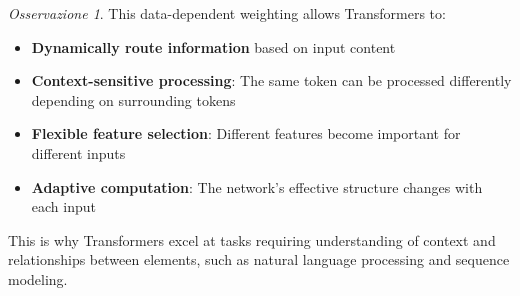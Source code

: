 \documentclass[11pt,a4paper]{article}
\theoremstyle{definition}
\theoremstyle{plain}
\theoremstyle{remark}
\newtheorem*{observation}{Osservazione}
\begin{document}
\begin{observation}
This data-dependent weighting allows Transformers to:
\begin{itemize}
    \item \textbf{Dynamically route information} based on input content
    \item \textbf{Context-sensitive processing}: The same token can be processed differently depending on surrounding tokens
    \item \textbf{Flexible feature selection}: Different features become important for different inputs
    \item \textbf{Adaptive computation}: The network's effective structure changes with each input
\end{itemize}

This is why Transformers excel at tasks requiring understanding of context and relationships between elements, such as natural language processing and sequence modeling.
\end{observation}
\end{document}
